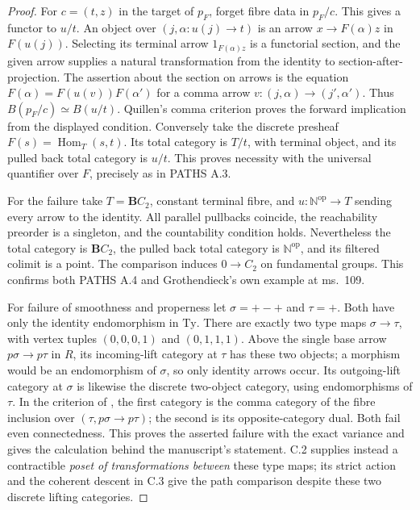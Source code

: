 \begin{proof}
For $c=(t,z)$ in the target of $p_F$, forget fibre data in $p_F/c$.
This gives a functor to $u/t$. An object over
$(j,\alpha:u(j)\to t)$ is an arrow $x\to F(\alpha)z$ in
$F(u(j))$. Selecting its terminal arrow $1_{F(\alpha)z}$ is a
functorial section, and the given arrow supplies a natural
transformation from the identity to section-after-projection.
The assertion about the section on arrows is the equation
$F(\alpha)=F(u(v))F(\alpha')$ for a comma arrow
$v:(j,\alpha)\to(j',\alpha')$. Thus
$B(p_F/c)\simeq B(u/t)$. Quillen's comma criterion proves the
forward implication from the displayed condition. Conversely take
the discrete presheaf $F(s)=\operatorname{Hom}_T(s,t)$.
Its total category is $T/t$, with terminal object, and its pulled
back total category is $u/t$. This proves necessity with the
universal quantifier over $F$, precisely as in PATHS A.3.

For the failure take $T=\mathbf B C_2$, constant terminal fibre,
and $u:\mathbb N^{\mathrm{op}}\to T$ sending every arrow to
the identity. All parallel pullbacks coincide, the reachability
preorder is a singleton, and the countability condition holds.
Nevertheless the total category is $\mathbf B C_2$, the pulled
back total category is $\mathbb N^{\mathrm{op}}$, and its
filtered colimit is a point. The comparison induces
$0\to C_2$ on fundamental groups. This confirms both PATHS A.4
and Grothendieck's own example at ms.~109.

For failure of smoothness and properness let $\sigma=+-+$ and
$\tau=+$. Both have only the identity endomorphism in
$\mathrm{Ty}$. There are exactly two type maps
$\sigma\to\tau$, with vertex tuples $(0,0,0,1)$ and
$(0,1,1,1)$. Above the single base arrow $p\sigma\to p\tau$
in $R$, its incoming-lift category at $\tau$ has these two
objects; a morphism would be an endomorphism of $\sigma$, so
only identity arrows occur. Its outgoing-lift category at $\sigma$
is likewise the discrete two-object category, using endomorphisms
of $\tau$. In the criterion of
\cite[Theorem~1.2(b)]{CpathsMaltsiniotis}, the first category is
the comma category of the fibre inclusion over
$(\tau,p\sigma\to p\tau)$; the second is its opposite-category
dual. Both fail even connectedness. This proves the asserted
failure with the exact variance and gives the calculation behind
the manuscript's statement. C.2 supplies instead a contractible
\emph{poset of transformations between} these type maps; its
strict action and the coherent descent in C.3 give the path
comparison despite these two discrete lifting categories.
\end{proof}


